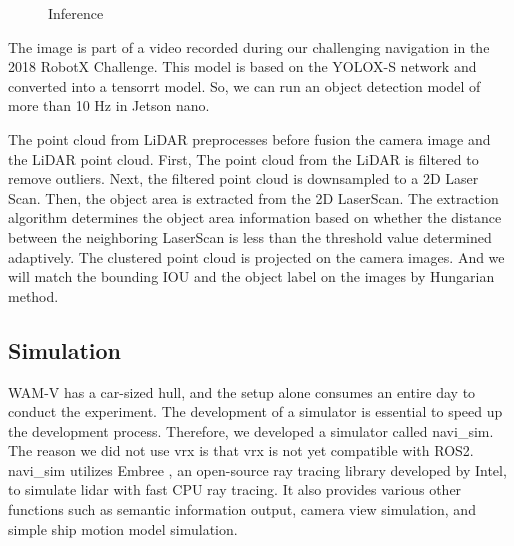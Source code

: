 \documentclass[lettersize,journal]{IEEEtran}
\begin{document}
\begin{figure}[H]
    \begin{center}
  \end{center}
  \caption{Inference}
  \label{fig:inference}
\end{figure}

The image is part of a video recorded during our challenging navigation in the 2018 RobotX Challenge.\cite{RobotX2018_video}
This model is based on the YOLOX-S network and converted into a tensorrt model.
So, we can run an object detection model of more than 10 Hz in Jetson nano.

\indent The point cloud from LiDAR preprocesses before fusion the camera image and the LiDAR point cloud.
First, The point cloud from the LiDAR is filtered to remove outliers.
Next, the filtered point cloud is downsampled to a 2D Laser Scan.
Then, the object area is extracted from the 2D LaserScan. \cite{scan_segmentation}
The extraction algorithm determines the object area information based on whether the distance between 
the neighboring LaserScan is less than the threshold value determined adaptively.
The clustered point cloud is projected on the camera images.
And we will match the bounding IOU and the object label on the images by Hungarian method.

\subsection{Simulation}

WAM-V has a car-sized hull, and the setup alone consumes an entire day to conduct the experiment.
The development of a simulator is essential to speed up the development process.
Therefore, we developed a simulator called navi\_sim.
The reason we did not use vrx is that vrx is not yet compatible with ROS2.
navi\_sim utilizes Embree \cite{embree}, an open-source ray tracing library developed by Intel, to simulate lidar with fast CPU ray tracing.
It also provides various other functions such as semantic information output, camera view simulation, and simple ship motion model simulation.
\end{document}
